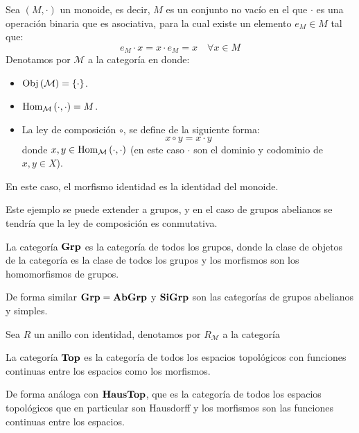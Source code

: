 \documentclass[12pt]{report}
\theoremstyle{largebreak}
\newcommand{\Obj}[1]{\ensuremath{\textup{Obj}\left(#1\right)}}
\newcommand{\Hom}[3]{\ensuremath{\textup{Hom}_{#1}\left(#2,#3\right)}}
\newcommand{\Cat}[1]{\ensuremath{\textup{\textbf{#1}}}}
\begin{document}
    \begin{exa}
        Sea $(M,\cdot)$ un monoide, es decir, $M$ es un conjunto no vacío en el que $\cdot$ es una operación binaria que es asociativa, para la cual existe un elemento $e_M\in M$ tal que:
        \begin{equation*}
            e_M\cdot x=x\cdot e_M=x\quad\forall x\in M
        \end{equation*}
        Denotamos por $\mathcal{M}$ a la categoría en donde:
        \begin{itemize}
            \item $\Obj{\mathcal{M}}=\left\{\cdot \right\}$.
            \item $\Hom{\mathcal{M}}{\cdot}{\cdot}=M$.
            \item La ley de composición $\circ$, se define de la siguiente forma:
            \begin{equation*}
                x\circ y=x\cdot y
            \end{equation*}
            donde $x,y\in \Hom{\mathcal{M}}{\cdot}{\cdot}$ (en este caso $\cdot$ son el dominio y codominio de $x,y\in X$).
        \end{itemize}
        En este caso, el morfismo identidad es la identidad del monoide.

        Este ejemplo se puede extender a grupos, y en el caso de grupos abelianos se tendría que la ley de composición es conmutativa.
    \end{exa}

    \begin{exa}
        La categoría $\Cat{Grp}$ es la categoría de todos los grupos, donde la clase de objetos de la categoría es la clase de todos los grupos y los morfismos son los homomorfismos de grupos.

        De forma similar $\Cat{Grp}=\Cat{AbGrp}$ y $\Cat{SiGrp}$ son las categorías de grupos abelianos y simples.
    \end{exa}

    \begin{exa}
        Sea $R$ un anillo con identidad, denotamos por $R_\mathcal{M}$ a la categoría
    \end{exa}

    \begin{exa}
        La categoría $\Cat{Top}$ es la categoría de todos los espacios topológicos con funciones continuas entre los espacios como los morfismos.

        De forma análoga con $\Cat{HausTop}$, que es la categoría de todos los espacios topológicos que en particular son Hausdorff y los morfismos son las funciones continuas entre los espacios.
    \end{exa}
\end{document}
